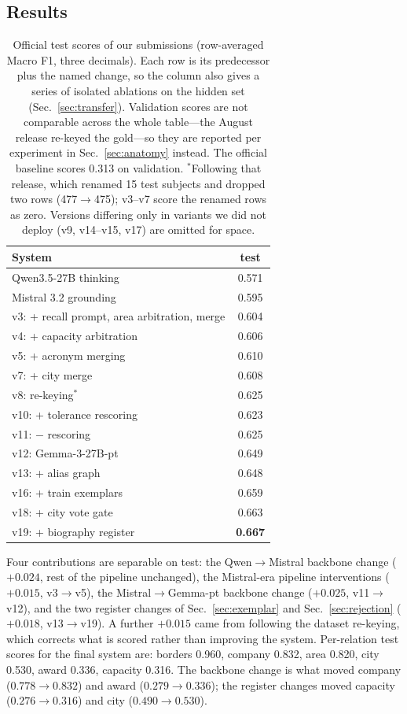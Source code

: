 \documentclass[11pt]{article}
\begin{document}
\subsection{Results}

\begin{table}[t]
\centering
\footnotesize
\setlength{\tabcolsep}{4pt}
\begin{tabular}{lc}
\toprule
System & test \\
\midrule
Qwen3.5-27B thinking & 0.571 \\
\midrule
Mistral 3.2 grounding & 0.595 \\
v3: + recall prompt, area arbitration, merge & 0.604 \\
v4: + capacity arbitration & 0.606 \\
v5: + acronym merging & 0.610 \\
v7: + city merge & 0.608 \\
v8: re-keying$^{\ast}$ & 0.625 \\
v10: + tolerance rescoring & 0.623 \\
v11: $-$ rescoring & 0.625 \\
\midrule
v12: Gemma-3-27B-pt & 0.649 \\
v13: + alias graph & 0.648 \\
v16: + train exemplars & 0.659 \\
v18: + city vote gate & 0.663 \\
v19: + biography register & \textbf{0.667} \\
\bottomrule
\end{tabular}
\caption{Official test scores of our submissions (row-averaged Macro F1,
three decimals). Each row is its predecessor plus the named change, so
the column also gives a series of isolated ablations on the hidden set
(Sec.~\ref{sec:transfer}). Validation scores are not comparable across
the whole table---the August release re-keyed the gold---so they are
reported per experiment in Sec.~\ref{sec:anatomy} instead. The official
baseline scores 0.313 on validation. $^{\ast}$Following that release,
which renamed 15 test subjects and dropped two rows
(477$\rightarrow$475); v3--v7 score the renamed rows as zero. Versions
differing only in variants we did not deploy (v9, v14--v15, v17) are
omitted for space.}
\label{tab:main}
\end{table}

Four contributions are separable on test: the Qwen$\rightarrow$Mistral
backbone change ($+0.024$, rest of the pipeline unchanged), the
Mistral-era pipeline interventions ($+0.015$, v3$\rightarrow$v5), the
Mistral$\rightarrow$Gemma-pt backbone change ($+0.025$,
v11$\rightarrow$v12), and the two register changes of
Sec.~\ref{sec:exemplar} and Sec.~\ref{sec:rejection} ($+0.018$,
v13$\rightarrow$v19). A further $+0.015$ came from following the dataset
re-keying, which corrects what is scored rather than improving the
system. Per-relation test scores for the final system are: borders 0.960,
company 0.832, area 0.820, city 0.530, award 0.336, capacity 0.316. The
backbone change is what moved company ($0.778\rightarrow0.832$) and award
($0.279\rightarrow0.336$); the register changes moved capacity
($0.276\rightarrow0.316$) and city ($0.490\rightarrow0.530$).
\end{document}
